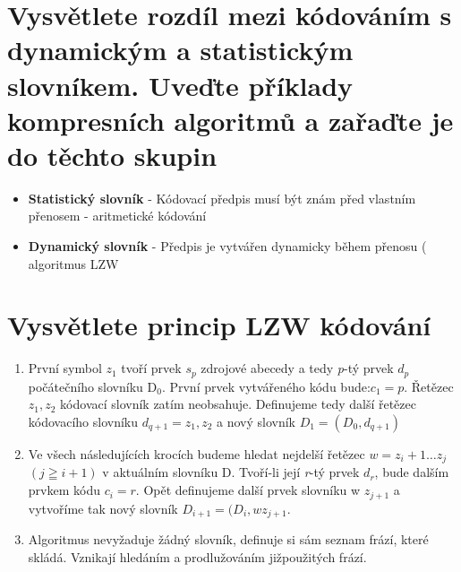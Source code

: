 \section{Vysvětlete rozdíl mezi kódováním s dynamickým a statistickým slovníkem. Uveďte příklady kompresních algoritmů a zařaďte je do těchto skupin}
\begin{itemize}
    \item  \textbf{Statistický slovník} - Kódovací předpis musí být znám před vlastním přenosem - aritmetické kódování
    \item \textbf{Dynamický slovník} - Předpis je vytvářen dynamicky během přenosu ( algoritmus LZW
\end{itemize}

\section{Vysvětlete princip LZW kódování}
\begin{enumerate}
    \item První symbol $z_1$ tvoří prvek $s_p$ zdrojové abecedy a tedy \emph{p}-tý prvek $d_p$ počátečního slovníku D$_0$.
    První prvek vytvářeného kódu bude:$c_1 = p$.
    Řetězec $z_1, z_2$ kódovací slovník zatím neobsahuje.
    Definujeme tedy další řetězec kódovacího slovníku $d_{q+1} = z_1, z_2$ a nový slovník $D_1=(D_0,d_{q+1}) $
    \item Ve všech následujících krocích budeme hledat nejdelší řetězec $w = z_i+1\dots z_j$ $(j\geqq i+1)$ v aktuálním slovníku D.
    Tvoří-li její \emph{r}-tý prvek $d_r$, bude dalším prvkem kódu $c_i=r$. 
    Opět definujeme další prvek slovníku w $z_{j+1}$ a vytvoříme tak nový slovník $D_{i+1} = (D_i, w\mathrm{ }z_{j+1}$.
    \item Algoritmus nevyžaduje žádný slovník, definuje si sám seznam frází, které skládá. Vznikají hledáním a prodlužováním jižpoužitých frází.
\end{enumerate}
